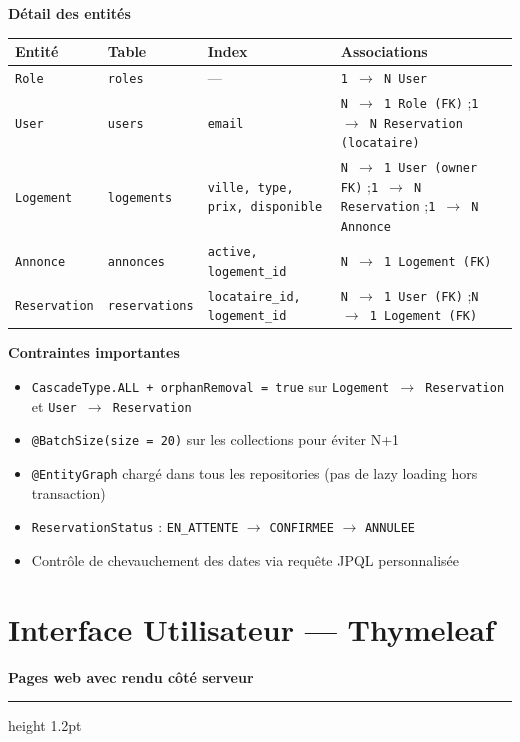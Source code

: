 \documentclass[12pt,a4paper]{article}
\newcommand{\sectiontitle}[1]{%
    \vspace{0.6em}\noindent%
    \textcolor{primary}{\large\bfseries #1}%
    \par\vspace{0.3em}%
    \hrule height 1.2pt \vspace{0.4em}%
}
\newcommand{\subtitle}[1]{%
    \vspace{0.4em}\noindent%
    \textcolor{primary!80!black}{\bfseries #1}\par\vspace{0.2em}%
}
\begin{document}
\subtitle{Détail des entités}
\begin{center}
\small
\begin{tabularx}{\textwidth}{l l l X}
\toprule
\textbf{Entité} & \textbf{Table} & \textbf{Index} & \textbf{Associations} \\
\midrule
\texttt{Role} & \texttt{roles} & --- & \texttt{1 $\to$ N User} \\
\texttt{User} & \texttt{users} & \texttt{email} & \texttt{N $\to$ 1 Role (FK)} ;\quad \texttt{1 $\to$ N Reservation (locataire)} \\
\texttt{Logement} & \texttt{logements} & \texttt{ville, type, prix, disponible} & \texttt{N $\to$ 1 User (owner FK)} ;\quad \texttt{1 $\to$ N Reservation} ;\quad \texttt{1 $\to$ N Annonce} \\
\texttt{Annonce} & \texttt{annonces} & \texttt{active, logement\_id} & \texttt{N $\to$ 1 Logement (FK)} \\
\texttt{Reservation} & \texttt{reservations} & \texttt{locataire\_id, logement\_id} & \texttt{N $\to$ 1 User (FK)} ;\quad \texttt{N $\to$ 1 Logement (FK)} \\
\bottomrule
\end{tabularx}
\end{center}

\vspace{0.4em}
\subtitle{Contraintes importantes}
\begin{itemize}[nosep, leftmargin=1.2em]
    \item \texttt{CascadeType.ALL + orphanRemoval = true} sur \texttt{Logement $\to$ Reservation} et \texttt{User $\to$ Reservation}
    \item \texttt{@BatchSize(size = 20)} sur les collections pour éviter N+1
    \item \texttt{@EntityGraph} chargé dans tous les repositories (pas de lazy loading hors transaction)
    \item \texttt{ReservationStatus} : \texttt{EN\_ATTENTE} $\to$ \texttt{CONFIRMEE} $\to$ \texttt{ANNULEE}
    \item Contrôle de chevauchement des dates via requête JPQL personnalisée
\end{itemize}

\section{Interface Utilisateur --- Thymeleaf}
\sectiontitle{Pages web avec rendu côté serveur}
\end{document}
